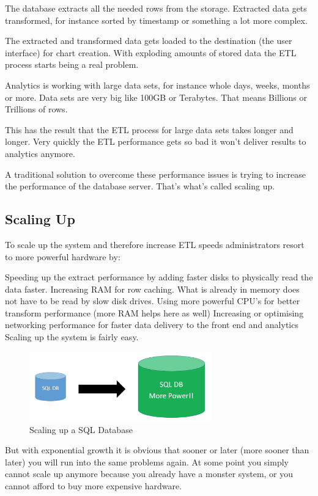 \documentclass[12pt, numbers=noenddot]{scrreprt} %
\begin{document}
The database extracts all the needed rows from the storage. Extracted data gets transformed, for instance sorted by timestamp or something a lot more complex.

The extracted and transformed data gets loaded to the destination (the user interface) for chart creation.
With exploding amounts of stored data the ETL process starts being a real problem.

Analytics is working with large data sets, for instance whole days, weeks, months or more. Data sets are very big like 100GB or Terabytes. That means Billions or Trillions of rows.

This has the result that the ETL process for large data sets takes longer and longer. Very quickly the ETL performance gets so bad it won’t deliver results to analytics anymore.

A traditional solution to overcome these performance issues is trying to increase the performance of the database server. That’s what’s called scaling up.

\subsection{Scaling Up}
To scale up the system and therefore increase ETL speeds administrators resort to more powerful hardware by:

Speeding up the extract performance by adding faster disks to physically read the data faster.
Increasing RAM for row caching. What is already in memory does not have to be read by slow disk drives.
Using more powerful CPU’s for better transform performance (more RAM helps here as well)
Increasing or optimising networking performance for faster data delivery to the front end and analytics
Scaling up the system is fairly easy.

\begin{figure}[htbp]
  \centering
     \includegraphics[width=0.7\textwidth]{images/SQL-Scaling-UP}
  \caption{Scaling up a SQL Database}
  \label{fig:Bild1}
\end{figure}

But with exponential growth it is obvious that sooner or later (more sooner than later) you will run into the same problems again. At some point you simply cannot scale up anymore because you already have a monster system, or you cannot afford to buy more expensive hardware.
\end{document}
